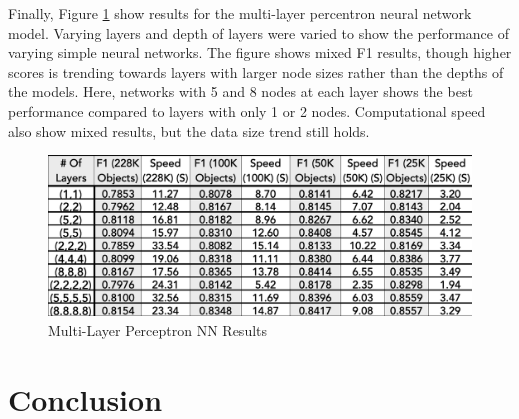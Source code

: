 \documentclass[11pt,sigconf]{acmart}
\begin{document}
Finally, Figure \ref{fig:mlpnn} show results for the multi-layer percentron neural 
network model. Varying layers and depth of layers were varied to show the 
performance of varying simple neural networks. The figure shows mixed F1 results, though 
higher scores is trending towards layers with larger node sizes rather than the depths of 
the models. Here, networks with 5 and 8 nodes at each layer shows the best performance 
compared to layers with only 1 or 2 nodes. Computational speed also show mixed results, 
but the data size trend still holds. 

\begin{figure}[htbp]
  \centering
  \includegraphics[scale=0.35]{mlpnn}
  \caption{Multi-Layer Perceptron NN Results}
  \label{fig:mlpnn}
\end{figure}

\section{Conclusion}
\end{document}
